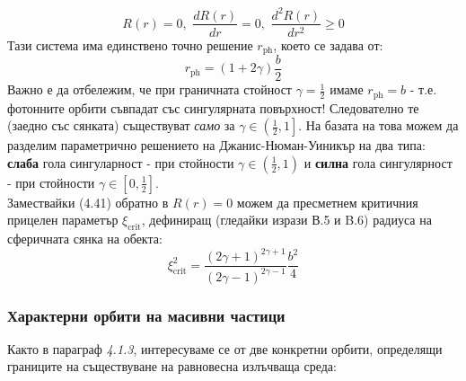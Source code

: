 	\begin{equation}
		R(r) = 0,\,\, \frac{dR(r)}{dr} = 0,\,\, \frac{d^2R(r)}{dr^2} \ge 0
	\end{equation}
Тази система има единствено точно решение $r_\text{ph}$, което се задава от:
\begin{equation}
	r_{\text{ph}} = (1 + 2\gamma)\frac{b}{2}
\end{equation}
Важно е да отбележим, че при граничната стойност $\gamma = \frac{1}{2}$ имаме $r_{\text{ph}} = b$ - т.е. фотонните орбити съвпадат със сингулярната повърхност! Следователно те (заедно със сянката) съществуват \emph{само} за $\gamma \in \left(\frac{1}{2}, 1\right]$. На базата на това можем да разделим параметрично решението на Джанис-Нюман-Уиникър на два типа: \textbf{слаба} гола сингуларност - при стойности $\gamma \in \left(\frac{1}{2},1\right)$ и \textbf{силна} гола сингулярност - при стойности $\gamma \in \left[0,\frac{1}{2}\right]$.\\\newline
Замествайки (4.41) обратно в $R(r) = 0$ можем да пресметнем критичния прицелен параметър $\xi_\text{crit}$, дефиниращ (гледайки изрази В.5 и B.6) радиуса на сферичната сянка на обекта:
\begin{equation}
	\xi_\text{crit}^2 = \frac{(2\gamma + 1)^{2\gamma + 1}}{(2\gamma - 1)^{2\gamma - 1}}\frac{b^2}{4}
\end{equation}
\subsubsection{Характерни орбити на масивни частици}

Както в параграф \emph{4.1.3}, интересуваме се от две конкретни орбити, определящи границите на съществуване на равновесна излъчваща среда:\\

